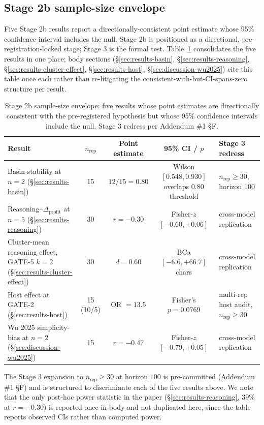 \subsection{Stage 2b sample-size envelope}
\label{sec:limitations-envelope}

Five Stage 2b results report a directionally-consistent point estimate whose 95\% confidence interval includes the null. Stage 2b is positioned as a directional, pre-registration-locked stage; Stage 3 is the formal test. Table~\ref{tab:sample-size-envelope} consolidates the five results in one place; body sections (\S\ref{sec:results-basin}, \S\ref{sec:results-reasoning}, \S\ref{sec:results-cluster-effect}, \S\ref{sec:results-host}, \S\ref{sec:discussion-wu2025}) cite this table once each rather than re-litigating the consistent-with-but-CI-spans-zero structure per result.

\begin{table}[h]
\centering
\caption{Stage 2b sample-size envelope: five results whose point estimates are directionally consistent with the pre-registered hypothesis but whose 95\% confidence intervals include the null. Stage 3 redress per Addendum \#1 \S F.}
\label{tab:sample-size-envelope}
\begin{tabular}{p{4.4cm}cccp{4.0cm}}
\toprule
Result & $n_{\text{rep}}$ & Point estimate & 95\% CI / $p$ & Stage 3 redress \\
\midrule
Basin-stability at $n=2$ (\S\ref{sec:results-basin}) & 15 & $12/15 = 0.80$ & Wilson $[0.548, 0.930]$ overlaps $0.80$ threshold & $n_{\text{rep}} \geq 30$, horizon $100$ \\
Reasoning--$\Delta_{\text{profit}}$ at $n=5$ (\S\ref{sec:results-reasoning}) & 30 & $r = -0.30$ & Fisher-$z$ $[-0.60, +0.06]$ & cross-model replication \\
Cluster-mean reasoning effect, GATE-5 $k=2$ (\S\ref{sec:results-cluster-effect}) & 30 & $d = 0.60$ & BCa $[-6.6, +66.7]$ chars & cross-model replication \\
Host effect at GATE-2 (\S\ref{sec:results-host}) & 15 (10/5) & OR $= 13.5$ & Fisher's $p = 0.0769$ & multi-rep host audit, $n_{\text{rep}} \geq 30$ \\
Wu 2025 simplicity-bias at $n=2$ (\S\ref{sec:discussion-wu2025}) & 15 & $r = -0.47$ & Fisher-$z$ $[-0.79, +0.05]$ & cross-model replication \\
\bottomrule
\end{tabular}
\end{table}

The Stage 3 expansion to $n_{\text{rep}} \geq 30$ at horizon $100$ is pre-committed (Addendum \#1 \S F) and is structured to discriminate each of the five results above. We note that the only post-hoc power statistic in the paper (\S\ref{sec:results-reasoning}, $39\%$ at $r = -0.30$) is reported once in body and not duplicated here, since the table reports observed CIs rather than computed power.
